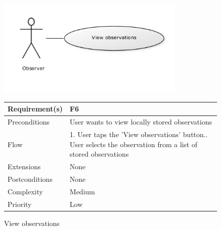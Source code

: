 \begin{figure}[!htb]
		\centering
		\includegraphics[width=0.8\textwidth]{reqspec/uc/viewobs.png}
		\caption{View observations}
		\label{fig:viewobs}
\begin{tabular}[t]{|l|p{}|}\hline
	Requirement(s)&F6\\\hline
	Preconditions&User wants to view locally stored observations\\\hline
	Flow&1. User taps the 'View observations' button.\newline
	2. User selects the observation from a list of stored observations \\\hline
	Extensions&None \\\hline
	Postconditions&None\\\hline
	Complexity&Medium\\\hline
	Priority&Low\\\hline
\end{tabular}
\end{figure}

\clearpage


